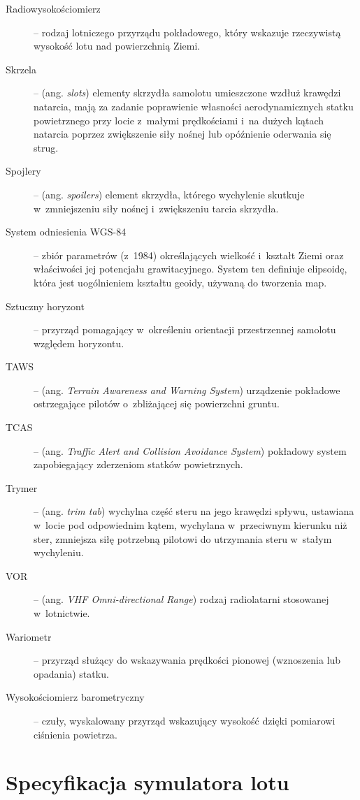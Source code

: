 \documentclass{mwrep}
\begin{document}
\begin{description}
\item[Radiowysokościomierz] -- rodzaj lotniczego przyrządu pokładowego, \linebreak który wskazuje rzeczywistą wysokość lotu nad powierzchnią Ziemi.
\item[Skrzela] -- (ang. \emph{slots}) elementy skrzydła samolotu umieszczone wzdłuż krawędzi natarcia, mają za zadanie poprawienie własności aerodynamicznych statku powietrznego przy locie z~małymi prędkościami i~na dużych kątach natarcia poprzez zwiększenie siły nośnej lub opóźnienie oderwania się strug.
\item[Spojlery] -- (ang. \emph{spoilers}) element skrzydła, którego wychylenie skutkuje w~zmniejszeniu siły nośnej i~zwiększeniu tarcia skrzydła.
\item[System odniesienia WGS-84] -- zbiór parametrów (z~1984) określających wielkość i~kształt Ziemi oraz właściwości jej potencjału grawitacyjnego. System ten definiuje elipsoidę, która jest uogólnieniem kształtu geoidy, używaną do tworzenia map.
\item[Sztuczny horyzont] -- przyrząd pomagający w~określeniu orientacji przestrzennej samolotu względem horyzontu.
\item[TAWS] -- (ang. \emph{Terrain Awareness and Warning System}) urządzenie pokładowe ostrzegające pilotów o~zbliżającej się powierzchni gruntu.
\item[TCAS] -- (ang. \emph{Traffic Alert and Collision Avoidance System}) pokładowy system zapobiegający zderzeniom statków powietrznych.
\item[Trymer] -- (ang. \emph{trim tab}) wychylna część steru na jego krawędzi spływu, ustawiana w~locie pod odpowiednim kątem, wychylana w~przeciwnym kierunku niż ster, zmniejsza siłę potrzebną pilotowi do utrzymania steru w~stałym wychyleniu.
\item[VOR] -- (ang. \emph{VHF Omni-directional Range}) rodzaj radiolatarni stosowanej w~lotnictwie.
\item[Wariometr] -- przyrząd służący do wskazywania prędkości pionowej \linebreak (wznoszenia lub opadania) statku.
\item[Wysokościomierz barometryczny] -- czuły, wyskalowany przyrząd \linebreak wskazujący wysokość dzięki pomiarowi ciśnienia powietrza.
\end{description}

\chapter{Specyfikacja symulatora lotu}
\end{document}
